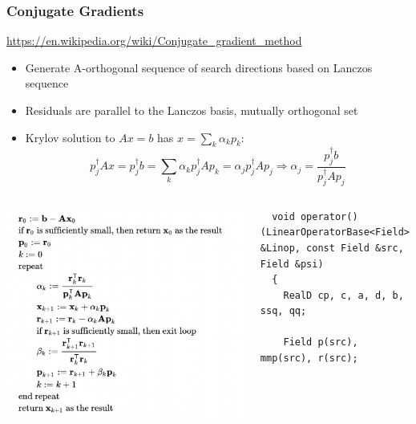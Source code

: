 \documentclass[pdf,ps,8pt]{beamer}
\newcommand{\miniscule}{\fontsize{3pt}{4pt}\selectfont}
\begin{document}
  \begin{frame}[fragile]\small\frametitle{ Conjugate Gradients}
    \href{https://en.wikipedia.org/wiki/Conjugate_gradient_method}{{\color{blue}https://en.wikipedia.org/wiki/Conjugate\_gradient\_method}}
   \begin{itemize}
      \item Generate A-orthogonal sequence of search directions based on Lanczos sequence
      \item Residuals are parallel to the Lanczos basis, mutually orthogonal set
      \item Krylov solution to $A x = b$ has $x = \sum\limits_k \alpha_k p_k$:
        $$
 p_j^\dagger A x = p_j^\dagger b = \sum\limits_k \alpha_k p_j^\dagger A p_k  = \alpha_j p_j^\dagger A p_j
\Rightarrow \alpha_j = \frac{p_j^\dagger b}{p_j^\dagger A p_j}$$
   \end{itemize}
    \begin{columns}
      \begin{column}{0.5\textwidth}
        \includegraphics[width=\textwidth]{ConjGradWikipedia.pdf}
      \end{column}
      \begin{column}{0.5\textwidth}
        {\miniscule
\begin{verbatim}
  void operator()(LinearOperatorBase<Field> &Linop, const Field &src, Field &psi) 
  {
    RealD cp, c, a, d, b, ssq, qq;

    Field p(src), mmp(src), r(src);


\end{verbatim}}
\end{column}
\end{columns}
\end{frame}
\end{document}
